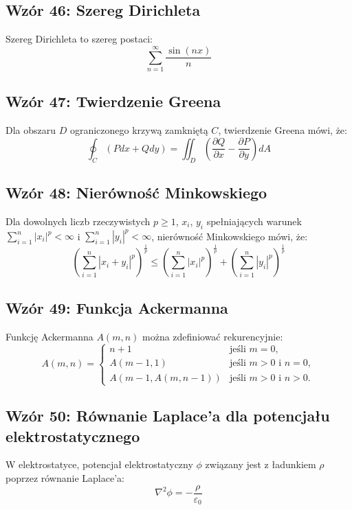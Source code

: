 \documentclass{article}
\begin{document}
\subsection*{Wzór 46: Szereg Dirichleta}

Szereg Dirichleta to szereg postaci:
\[ \sum_{n=1}^{\infty} \frac{\sin(nx)}{n} \]

\subsection*{Wzór 47: Twierdzenie Greena}

Dla obszaru \(D\) ograniczonego krzywą zamkniętą \(C\), twierdzenie Greena mówi, że:
\[ \oint_C (Pdx + Qdy) = \iint_D \left(\frac{\partial Q}{\partial x} - \frac{\partial P}{\partial y}\right) dA \]

\subsection*{Wzór 48: Nierówność Minkowskiego}

Dla dowolnych liczb rzeczywistych \(p \geq 1\), \(x_i\), \(y_i\) spełniających warunek \(\sum_{i=1}^{n} |x_i|^p < \infty\) i \(\sum_{i=1}^{n} |y_i|^p < \infty\), nierówność Minkowskiego mówi, że:
\[ \left(\sum_{i=1}^{n} |x_i + y_i|^p\right)^{\frac{1}{p}} \leq \left(\sum_{i=1}^{n} |x_i|^p\right)^{\frac{1}{p}} + \left(\sum_{i=1}^{n} |y_i|^p\right)^{\frac{1}{p}} \]

\subsection*{Wzór 49: Funkcja Ackermanna}

Funkcję Ackermanna \(A(m, n)\) można zdefiniować rekurencyjnie:
\[
A(m, n) =
\begin{cases}
  n+1 & \text{jeśli } m = 0, \\
  A(m-1, 1) & \text{jeśli } m > 0 \text{ i } n = 0, \\
  A(m-1, A(m, n-1)) & \text{jeśli } m > 0 \text{ i } n > 0.
\end{cases}
\]

\subsection*{Wzór 50: Równanie Laplace'a dla potencjału elektrostatycznego}

W elektrostatyce, potencjał elektrostatyczny \(\phi\) związany jest z ładunkiem \(\rho\) poprzez równanie Laplace'a:
\[ \nabla^2 \phi = -\frac{\rho}{\varepsilon_0} \]
\end{document}
